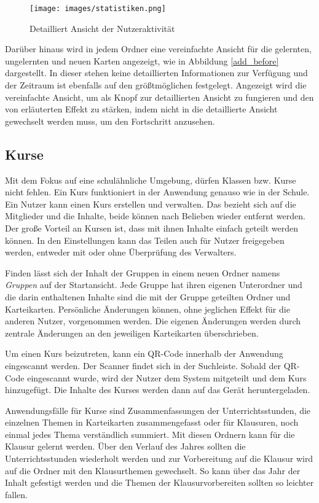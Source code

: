 \begin{figure}[ht!]
    \centering
    \texttt{[image: images/statistiken.png]}
    \caption{Detailliert Ansicht der Nutzeraktivität}
    \label{fig:statistics}
\end{figure}

Darüber hinaus wird in jedem Ordner eine vereinfachte Ansicht für die gelernten, ungelernten und neuen Karten angezeigt, wie in Abbildung \ref{add_before} dargestellt. In dieser stehen keine detaillierten Informationen zur Verfügung und der Zeitraum ist ebenfalls auf den größtmöglichen festgelegt. Angezeigt wird die vereinfachte Ansicht, um als Knopf zur detaillierten Ansicht zu fungieren und den von \cite{AtomicHabits} erläuterten Effekt zu stärken, indem nicht in die detaillierte Ansicht gewechselt werden muss, um den Fortschritt anzusehen.

\subsection{Kurse}
Mit dem Fokus auf eine schulähnliche Umgebung, dürfen Klassen bzw. Kurse nicht fehlen. Ein Kurs funktioniert in der Anwendung genauso wie in der Schule. Ein Nutzer kann einen Kurs erstellen und verwalten. Das bezieht sich auf die Mitglieder und die Inhalte, beide können nach Belieben wieder entfernt werden. Der große Vorteil an Kursen ist, dass mit ihnen Inhalte einfach geteilt werden können. In den Einstellungen kann das Teilen auch für Nutzer freigegeben werden, entweder mit oder ohne Überprüfung des Verwalters.

Finden lässt sich der Inhalt der Gruppen in einem neuen Ordner namens \textit{Gruppen} auf der Startansicht. Jede Gruppe hat ihren eigenen Unterordner und die darin enthaltenen Inhalte sind die mit der Gruppe geteilten Ordner und Karteikarten. Persönliche Änderungen können, ohne jeglichen Effekt für die anderen Nutzer, vorgenommen werden. Die eigenen Änderungen werden durch zentrale Änderungen an den jeweiligen Karteikarten überschrieben.

Um einen Kurs beizutreten, kann ein QR-Code innerhalb der Anwendung eingescannt werden. Der Scanner findet sich in der Suchleiste. Sobald der QR-Code eingescannt wurde, wird der Nutzer dem System mitgeteilt und dem Kurs hinzugefügt. Die Inhalte des Kurses werden dann auf das Gerät heruntergeladen.

Anwendungsfälle für Kurse sind Zusammenfassungen der Unterrichtsstunden, die einzelnen Themen in Karteikarten zusammengefasst oder für Klausuren, noch einmal jedes Thema verständlich summiert. Mit diesen Ordnern kann für die Klausur gelernt werden. Über den Verlauf des Jahres sollten die Unterrichtsstunden wiederholt werden und zur Vorbereitung auf die Klausur wird auf die Ordner mit den Klausurthemen gewechselt. So kann über das Jahr der Inhalt gefestigt werden und die Themen der Klausurvorbereiten sollten so leichter fallen.

